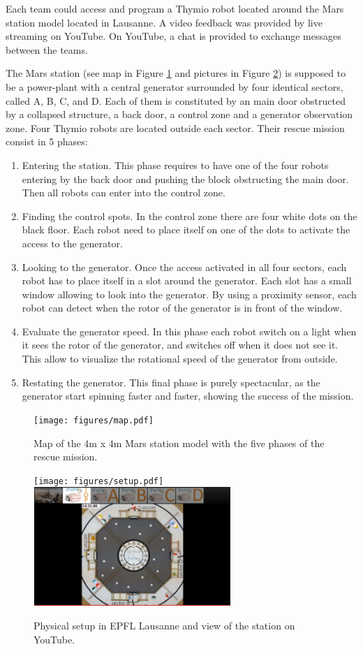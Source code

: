\documentclass{intech-journal}
\begin{document}
Each team could access and program a Thymio robot located around the Mars station model located in Lausanne. 
A video feedback was provided by live streaming on YouTube. 
On YouTube, a chat is provided to exchange messages between the teams.

The Mars station (see map in Figure \ref{fig:map} and pictures in Figure \ref{fig:setup-physical}) is supposed to be a power-plant with a central generator surrounded by four identical sectors, called A, B, C, and D.
Each of them is constituted by an main door obstructed by a collapsed structure, a back door, a control zone and a generator observation zone.
Four Thymio robots are located outside each sector. 
Their rescue mission consist in 5 phases:
\begin{enumerate}
\item Entering the station. This phase requires to have one of the four robots entering by the back door and pushing the block obstructing the main door. Then all robots can enter into the control zone.
\item Finding the control spots. In the control zone there are four white dots on the black floor. Each robot need to place itself on one of the dots to activate the access to the generator.
\item Looking to the generator. Once the access activated in all four sectors, each robot has to place itself in a slot around the generator. Each slot has a small window allowing to look into the generator. By using a proximity sensor, each robot can detect when the rotor of the generator is in front of the window.
\item Evaluate the generator speed. In this phase each robot switch on a light when it sees the rotor of the generator, and switches off when it does not see it. This allow to visualize the rotational speed of the generator from outside.
\item Restating the generator. This final phase is purely spectacular, as the generator start spinning faster and faster, showing the success of the mission.
\end{enumerate}

\begin{figure}[ht]
 \centering
    \texttt{[image: figures/map.pdf]}
  \caption{Map of the 4m x 4m Mars station model with the five phases of the rescue mission.}
  \label{fig:map} 
\end{figure}

\begin{figure}[ht]
 \centering
    \texttt{[image: figures/setup.pdf]}
    \includegraphics[height=45mm]{figures/youtube-view.png}
  \caption{Physical setup in EPFL Lausanne and view of the station on YouTube.}
  \label{fig:setup-physical} 
\end{figure}
\end{document}
